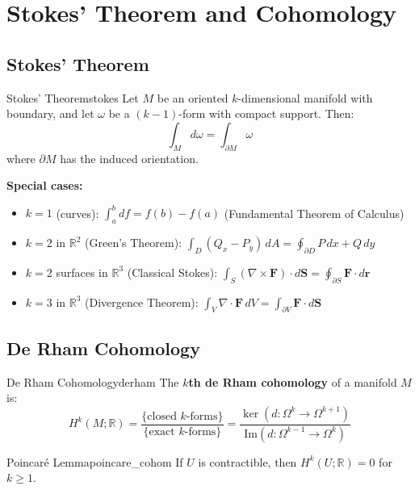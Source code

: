 \documentclass[11pt, letterpaper, openany]{book}
\begin{document}
\chapter{Stokes' Theorem and Cohomology}

\section{Stokes' Theorem}

\begin{thm}{Stokes' Theorem}{stokes}
Let $M$ be an oriented $k$-dimensional manifold with boundary, and let $\omega$ be a $(k-1)$-form with compact support. Then:
\[
\int_M d\omega = \int_{\partial M} \omega
\]
where $\partial M$ has the induced orientation.
\end{thm}

\textbf{Special cases:}
\begin{itemize}
    \item $k = 1$ (curves): $\int_a^b df = f(b) - f(a)$ (Fundamental Theorem of Calculus)
    \item $k = 2$ in $\mathbb{R}^2$ (Green's Theorem): $\int_D (Q_x - P_y) \, dA = \oint_{\partial D} P\,dx + Q\,dy$
    \item $k = 2$ surfaces in $\mathbb{R}^3$ (Classical Stokes): $\int_S (\nabla \times \mathbf{F}) \cdot d\mathbf{S} = \oint_{\partial S} \mathbf{F} \cdot d\mathbf{r}$
    \item $k = 3$ in $\mathbb{R}^3$ (Divergence Theorem): $\int_V \nabla \cdot \mathbf{F} \, dV = \int_{\partial V} \mathbf{F} \cdot d\mathbf{S}$
\end{itemize}

\section{De Rham Cohomology}

\begin{defn}{De Rham Cohomology}{derham}
The \textbf{$k$th de Rham cohomology} of a manifold $M$ is:
\[
H^k(M; \mathbb{R}) = \frac{\{\text{closed } k\text{-forms}\}}{\{\text{exact } k\text{-forms}\}} = \frac{\ker(d: \Omega^k \to \Omega^{k+1})}{\text{Im}(d: \Omega^{k-1} \to \Omega^k)}
\]
\end{defn}

\begin{thm}{Poincaré Lemma}{poincare_cohom}
If $U$ is contractible, then $H^k(U; \mathbb{R}) = 0$ for $k \geq 1$.
\end{thm}
\end{document}
